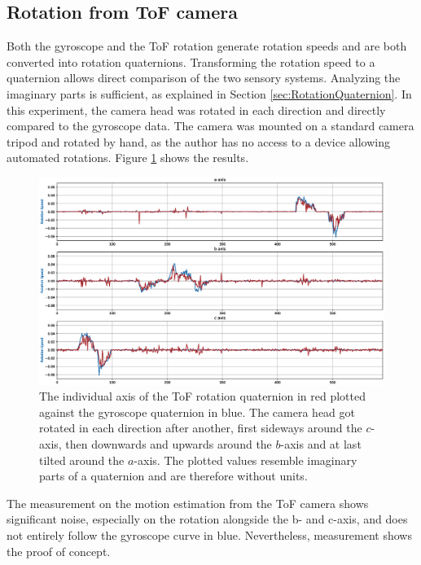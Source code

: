 \subsection{Rotation from ToF camera}
\label{sec:results_tof_rotation}
Both the gyroscope and the ToF rotation generate rotation speeds and are both converted into rotation quaternions. Transforming the rotation speed to a quaternion allows direct comparison of the two sensory systems. Analyzing the imaginary parts is sufficient, as explained in Section \ref{sec:RotationQuaternion}.
In this experiment, the camera head was rotated in each direction and directly compared to the gyroscope data. The camera was mounted on a standard camera tripod and rotated by hand, as the author has no access to a device allowing automated rotations. Figure \ref{im:tof_rotation_measurement} shows the results. 
\begin{figure}[H]
  \centering
  \includegraphics[width=1.0\textwidth]{images/tof_rotation_measurement.eps}
  \caption{The individual axis of the ToF rotation quaternion in red plotted against the gyroscope quaternion in blue. The camera head got rotated in each direction after another, first sideways around the $c$-axis, then downwards and upwards around the $b$-axis and at last tilted around the $a$-axis. The plotted values resemble imaginary parts of a quaternion and are therefore without units.}
  \label{im:tof_rotation_measurement}
\end{figure}
The measurement on the motion estimation from the ToF camera shows significant noise, especially on the rotation alongside the b- and c-axis, and does not entirely follow the gyroscope curve in blue. Nevertheless, measurement shows the proof of concept.

